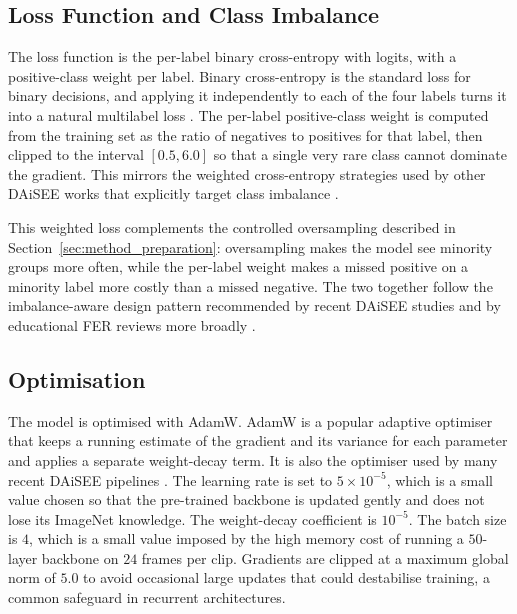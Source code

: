 \subsection{Loss Function and Class Imbalance}\label{sec:method_loss}

The loss function is the per-label binary cross-entropy with logits, with a positive-class weight per label. Binary cross-entropy is the standard loss for binary decisions, and applying it independently to each of the four labels turns it into a natural multilabel loss \cite{rianto_engagement_2025}. The per-label positive-class weight is computed from the training set as the ratio of negatives to positives for that label, then clipped to the interval $[0.5, 6.0]$ so that a single very rare class cannot dominate the gradient. This mirrors the weighted cross-entropy strategies used by other DAiSEE works that explicitly target class imbalance \cite{abedi_improving_2021,mehta_three-dimensional_2022,rianto_engagement_2025}.

This weighted loss complements the controlled oversampling described in Section~\ref{sec:method_preparation}: oversampling makes the model see minority groups more often, while the per-label weight makes a missed positive on a minority label more costly than a missed negative. The two together follow the imbalance-aware design pattern recommended by recent DAiSEE studies and by educational FER reviews more broadly \cite{abedi_improving_2021,mehta_three-dimensional_2022,santoni_convolutional_2023,rianto_engagement_2025,lek_academic_2023}.

\subsection{Optimisation}\label{sec:method_optim}

The model is optimised with AdamW. AdamW is a popular adaptive optimiser that keeps a running estimate of the gradient and its variance for each parameter and applies a separate weight-decay term. It is also the optimiser used by many recent DAiSEE pipelines \cite{shiri_detection_2024,tulsani_realtime_2025}. The learning rate is set to $5 \times 10^{-5}$, which is a small value chosen so that the pre-trained backbone is updated gently and does not lose its ImageNet knowledge. The weight-decay coefficient is $10^{-5}$. The batch size is $4$, which is a small value imposed by the high memory cost of running a $50$-layer backbone on $24$ frames per clip. Gradients are clipped at a maximum global norm of $5.0$ to avoid occasional large updates that could destabilise training, a common safeguard in recurrent architectures.

